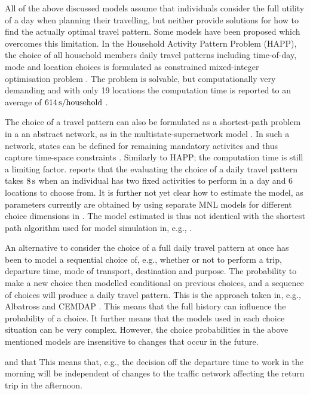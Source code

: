 All of the above discussed models assume that individuals consider the full utility of a day when planning their travelling, but neither provide solutions for how to find the actually optimal travel pattern. Some models have been proposed which overcomes this limitation. In the Household Activity Pattern Problem (HAPP), the choice of all household members daily travel patterns including time-of-day, mode and location choices is formulated as constrained mixed-integer optimisation problem \citep{Recker01,Recker08,Recker13,yuan2014HAPP}. The problem is solvable, but computationally very demanding and with only 19 locations the computation time is reported to an average of $614\, \mathrm{s/household}$ \citep{Recker13}.

The choice of a travel pattern can also be formulated as a shortest-path problem in a an abstract network, as in the multistate-supernetwork model \citep{arentze04Multistate}. In such a network, states can be defined for remaining mandatory activites and thus capture time-space constraints \citep{liao2013incorporating} \citep{liao2016modeling}. Similarly to HAPP; the computation time is still a limiting factor. \citet{liao2016modeling} reports that the evaluating the choice of a daily travel pattern takes $8\, \mathrm{s}$ when an individual has two fixed activities to perform in a day and 6 locations to choose from. It is further not yet clear how to estimate the model, as parameters currently are obtained by using separate MNL models for different choice dimensions in \citet{Liao2017}. The model estimated is thus not identical  with the shortest path algorithm used for model simulation in, e.g., \citet{liao2016modeling}.

An alternative to consider the choice of a full daily travel pattern at once has been to model a sequential choice of, e.g., whether or not to perform a trip, departure time, mode of transport, destination and purpose. The probability to make a new choice then modelled conditional on previous choices, and a sequence of choices will produce a daily travel pattern. This is the approach taken in, e.g., Albatross \citet{timmermans2001modeling} and CEMDAP \citep{bhat04}. This means that the full history can influence the probability of a choice. It further means that the models used in each choice situation can be very complex. However, the choice probabilities in the above mentioned models are insensitive to changes that occur in the future.  

and that  This means that, e.g., the decision off the departure time to work in the morning will be independent of changes to the traffic network affecting the return trip in the afternoon. 


